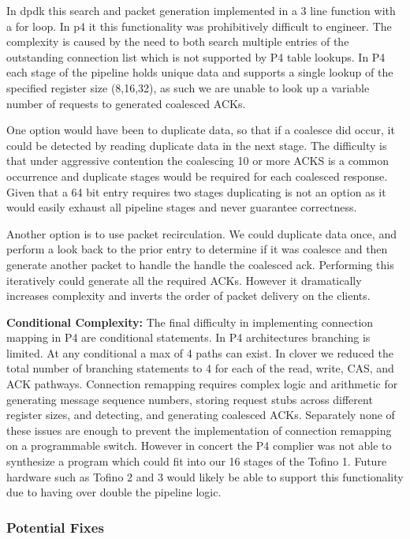 In dpdk this search and packet generation implemented in a 3 line function with
a for loop. In p4 it this functionality was prohibitively difficult to engineer.
The complexity is caused by the need to both search multiple entries of the
outstanding connection list which is not supported by P4 table lookups. In P4
each stage of the pipeline holds unique data and supports a single lookup of the
specified register size (8,16,32), as such we are unable to look up a variable
number of requests to generated coalesced ACKs.

One option would have been to duplicate data, so that if a coalesce did occur,
it could be detected by reading duplicate data in the next stage.  The
difficulty is that under aggressive contention the coalescing 10 or more ACKS is
a common occurrence and duplicate stages would be required for each coalesced
response. Given that a 64 bit entry requires two stages duplicating is not an
option as it would easily exhaust all pipeline stages and never guarantee
correctness.

Another option is to use packet recirculation. We could duplicate data once, and
perform a look back to the prior entry to determine if it was coalesce and then
generate another packet to handle the handle the coalesced ack. 
Performing this iteratively could generate all the required ACKs. However it
dramatically increases complexity and inverts the order of packet delivery on
the clients.

\textbf{Conditional Complexity:} The final difficulty in implementing connection
mapping in P4 are conditional statements. In P4 architectures branching is
limited. At any conditional a max of 4 paths can exist.  In clover we reduced
the total number of branching statements to 4 for each of the read, write, CAS,
and ACK pathways. Connection remapping requires complex logic and arithmetic for
generating message sequence numbers, storing request stubs across different
register sizes, and detecting, and generating coalesced ACKs.  Separately none
of these issues are enough to prevent the implementation of connection remapping
on a programmable switch. However in concert the P4 complier was not able to
synthesize a program which could fit into our 16 stages of the Tofino 1. Future
hardware such as Tofino 2 and 3 would likely be able to support this
functionality due to having over double the pipeline logic.

\subsubsection{Potential Fixes}

